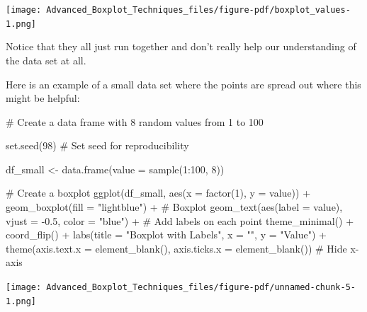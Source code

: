 \documentclass[
  letterpaper,
  DIV=11,
  numbers=noendperiod]{scrreprt}
\newenvironment{Shaded}{\begin{snugshade}}{\end{snugshade}}
\newcommand{\AttributeTok}[1]{\textcolor[rgb]{0.40,0.45,0.13}{#1}}
\newcommand{\CommentTok}[1]{\textcolor[rgb]{0.37,0.37,0.37}{#1}}
\newcommand{\DecValTok}[1]{\textcolor[rgb]{0.68,0.00,0.00}{#1}}
\newcommand{\FloatTok}[1]{\textcolor[rgb]{0.68,0.00,0.00}{#1}}
\newcommand{\FunctionTok}[1]{\textcolor[rgb]{0.28,0.35,0.67}{#1}}
\newcommand{\NormalTok}[1]{\textcolor[rgb]{0.00,0.23,0.31}{#1}}
\newcommand{\OtherTok}[1]{\textcolor[rgb]{0.00,0.23,0.31}{#1}}
\newcommand{\SpecialCharTok}[1]{\textcolor[rgb]{0.37,0.37,0.37}{#1}}
\newcommand{\StringTok}[1]{\textcolor[rgb]{0.13,0.47,0.30}{#1}}
\begin{document}
\begin{center}
\texttt{[image: Advanced\_Boxplot\_Techniques\_files/figure-pdf/boxplot\_values-1.png]}
\end{center}

Notice that they all just run together and don't really help our
understanding of the data set at all.

Here is an example of a small data set where the points are spread out
where this might be helpful:

\begin{Shaded}
\begin{Highlighting}[]
\CommentTok{\# Create a data frame with 8 random values from 1 to 100}

\FunctionTok{set.seed}\NormalTok{(}\DecValTok{98}\NormalTok{)  }\CommentTok{\# Set seed for reproducibility}

\NormalTok{df\_small }\OtherTok{\textless{}{-}} \FunctionTok{data.frame}\NormalTok{(}\AttributeTok{value =} \FunctionTok{sample}\NormalTok{(}\DecValTok{1}\SpecialCharTok{:}\DecValTok{100}\NormalTok{, }\DecValTok{8}\NormalTok{))}

\CommentTok{\# Create a boxplot}
\FunctionTok{ggplot}\NormalTok{(df\_small, }\FunctionTok{aes}\NormalTok{(}\AttributeTok{x =} \FunctionTok{factor}\NormalTok{(}\DecValTok{1}\NormalTok{), }\AttributeTok{y =}\NormalTok{ value)) }\SpecialCharTok{+}
  \FunctionTok{geom\_boxplot}\NormalTok{(}\AttributeTok{fill =} \StringTok{"lightblue"}\NormalTok{) }\SpecialCharTok{+}  \CommentTok{\# Boxplot}
  \FunctionTok{geom\_text}\NormalTok{(}\FunctionTok{aes}\NormalTok{(}\AttributeTok{label =}\NormalTok{ value), }\AttributeTok{vjust =} \SpecialCharTok{{-}}\FloatTok{0.5}\NormalTok{, }\AttributeTok{color =} \StringTok{"blue"}\NormalTok{) }\SpecialCharTok{+}  \CommentTok{\# Add labels on each point}
  \FunctionTok{theme\_minimal}\NormalTok{() }\SpecialCharTok{+}
  \FunctionTok{coord\_flip}\NormalTok{() }\SpecialCharTok{+}
  \FunctionTok{labs}\NormalTok{(}\AttributeTok{title =} \StringTok{"Boxplot with Labels"}\NormalTok{, }\AttributeTok{x =} \StringTok{""}\NormalTok{, }\AttributeTok{y =} \StringTok{"Value"}\NormalTok{) }\SpecialCharTok{+}
  \FunctionTok{theme}\NormalTok{(}\AttributeTok{axis.text.x =} \FunctionTok{element\_blank}\NormalTok{(), }\AttributeTok{axis.ticks.x =} \FunctionTok{element\_blank}\NormalTok{())  }\CommentTok{\# Hide x{-}axis}
\end{Highlighting}
\end{Shaded}

\begin{center}
\texttt{[image: Advanced\_Boxplot\_Techniques\_files/figure-pdf/unnamed-chunk-5-1.png]}
\end{center}
\end{document}
